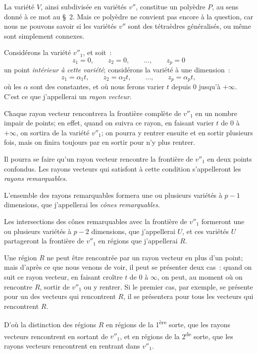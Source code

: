 \documentclass{article}
\begin{document}
La variété $V$, ainsi subdivisée en variétés $v''$, constitue un polyèdre $P$, au sens donné à ce mot au \S~2. Mais ce polyèdre ne convient pas encore à la question, car nous ne pouvons savoir si les variétés $v''$ sont des tétraèdres généralisés, ou même sont simplement connexes.

Considérons la variété $v''_{1}$, et soit~:
\[ z_{1} = 0, \qquad z_{2} = 0, \qquad \ldots, \qquad z_{p} = 0 \]
un point \emph{intérieur à cette variété}; considérons la variété à une dimension~:
\[ z_{1} = \alpha_{1} t, \qquad z_{2} = \alpha_{2} t, \qquad \ldots, \qquad z_{p} = \alpha_{p} t, \]
où les $\alpha$ sont des constantes, et où nous ferons varier $t$ depuis 0 jusqu'à $+\infty$. C'est ce que j'appellerai un \emph{rayon vecteur}.

Chaque rayon vecteur rencontrera la frontière complète de $v''_{1}$ en un nombre impair de points; en effet, quand on suivra ce rayon, en
faisant varier $t$ de 0 à $+\infty$, on sortira de la variété $v''_{1}$; on pourra y rentrer ensuite et en sortir plusieurs fois, mais on finira toujours par en sortir pour n'y plus rentrer.

Il pourra se faire qu'un rayon vecteur rencontre la frontière de $v''_{1}$ en deux points confondus. Les rayons vecteurs qui satisfont à cette condition s'appelleront les \emph{rayons remarquables}.

L'ensemble des rayons remarquables formera une ou plusieurs variétés à $p - 1$ dimensions, que j'appellerai les \emph{cônes remarquables}.

Les intersections des cônes remarquables avec la frontière de $v''_{1}$ formeront une ou plusieurs variétés à $p - 2$ dimensions, que j'appellerai $U$, et ces variétés $U$ partageront la frontière de $v''_{1}$ en régions que j'appellerai $R$.

Une région $R$ ne peut être rencontrée par un rayon vecteur en plus d'un point; mais d'après ce que nous venons de voir, il peut se présenter deux cas~: quand on suit ce rayon vecteur, en faisant croître $t$ de 0 à $\infty$, on peut, au moment où on rencontre $R$, sortir de $v''_{1}$ ou y rentrer. Si le premier cas, par exemple, se présente pour un des vecteurs qui rencontrent $R$, il se présentera pour tous les vecteurs qui rencontrent $R$.

D'où la distinction des régions $R$ en régions de la 1\textsuperscript{ère} sorte, que les rayons vecteurs rencontrent en sortant de $v''_{1}$, et en régions de la 2\textsuperscript{de} sorte, que les rayons vecteurs rencontrent en rentrant dans $v''_{1}$.
\end{document}
